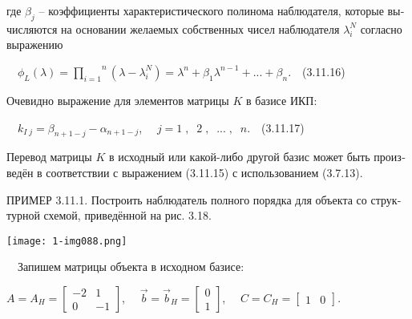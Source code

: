 \documentclass[a4paper]{article}
\begin{document}
{\begin{russian}\sffamily
где  $β_j$ – коэффициенты характеристического полинома наблюдателя, которые вычисляются на основании желаемых
собственных чисел наблюдателя  $λ_i^N$ согласно выражению
\end{russian}}

{\begin{russian}\sffamily
\ \  $ϕ_L\left(λ\right)=\overset n{\underset{i=1}{\prod }}\left(λ-λ_i^N\right)=λ^n+β_1λ^{n-1}+...+β_n$.\ \ (3.11.16)
\end{russian}}

{\begin{russian}\sffamily
Очевидно выражение для элементов матрицы  $K$ в базисе ИКП:
\end{russian}}

{\begin{russian}\sffamily
\ \  $k_{I\;j}=β_{n+1-j}-α_{n+1-j}$, \ \  $j=1\;,\;\;2\;,\;\;...\;,\;\;n$.\ \ (3.11.17)
\end{russian}}

{\begin{russian}\sffamily
Перевод матрицы  $K$ в исходный или какой-либо другой базис может быть произведён в соответствии с выражением (3.11.15)
с использованием (3.7.13).
\end{russian}}


\bigskip

{\begin{russian}\sffamily
ПРИМЕР 3.11.1. Построить наблюдатель полного порядка для объекта со структурной схемой, приведённой на рис. 3.18.
\end{russian}}

{\centering  \texttt{[image: 1-img088.png]} \par}
{\begin{russian}\sffamily
\ \ Запишем матрицы объекта в исходном базисе:
\end{russian}}

{\begin{russian}\sffamily
 $A=A_H=\left[\begin{matrix}-2&1\\0&-1\end{matrix}\right]$, \ \  $\vec b=\vec
b_H=\left[\begin{matrix}0\\1\end{matrix}\right]$, \ \  $C=C_H=\left[\begin{matrix}1&0\end{matrix}\right]$.
\end{russian}}
\end{document}
